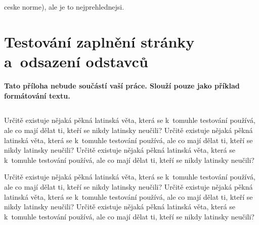 \documentclass[11pt,twoside,a4paper]{book}
\begin{document}
%




%
{
\def\CS{$\cal C\kern-0.1667em\lower.5ex\hbox{$\cal S$}\kern-0.075em $}

}

%
ceske norme), ale je to nejprehlednejsi.

\appendix

\chapter{Testování zaplnění stránky a~odsazení odstavců}
\textbf{\large Tato příloha nebude součástí vaší práce. 
Slouží pouze jako příklad formátování textu.}

\section*{}
Určitě existuje nějaká pěkná latinská věta, která se k~tomuhle testování používá, ale co mají dělat ti, kteří se nikdy
latinsky neučili? Určitě existuje nějaká pěkná latinská věta, která se k~tomuhle testování používá, ale co mají dělat
ti, kteří se nikdy latinsky neučili? Určitě existuje nějaká pěkná latinská věta, která se k~tomuhle testování používá,
ale co mají dělat ti, kteří se nikdy latinsky neučili?

Určitě existuje nějaká pěkná latinská věta, která se k~tomuhle testování používá, ale co mají dělat ti, kteří se nikdy
latinsky neučili? Určitě existuje nějaká pěkná latinská věta, která se k~tomuhle testování používá, ale co mají dělat
ti, kteří se nikdy latinsky neučili? Určitě existuje nějaká pěkná latinská věta, která se k~tomuhle testování používá,
ale co mají dělat ti, kteří se nikdy latinsky neučili?
\end{document}
